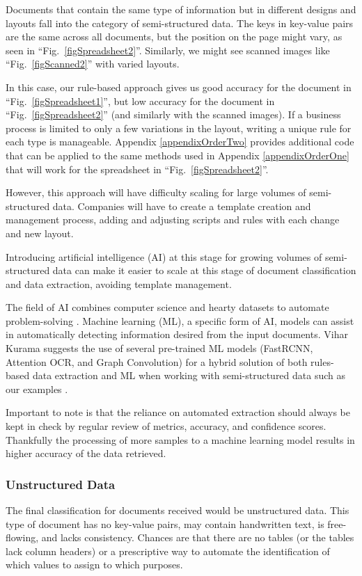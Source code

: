 \documentclass[conference, draftcls]{IEEEtran}
\begin{document}
Documents that contain the same type of information but in different designs and layouts fall into the category of semi-structured data. The keys in key-value pairs are the same across all documents, but the position on the page might vary, as seen in ``Fig.~\ref{figSpreadsheet2}''. Similarly, we might see scanned images like ``Fig.~\ref{figScanned2}'' with varied layouts.

In this case, our rule-based approach gives us good accuracy for the document in ``Fig.~\ref{figSpreadsheet1}'', but low accuracy for the document in ``Fig.~\ref{figSpreadsheet2}'' (and similarly with the scanned images). If a business process is limited to only a few variations in the layout, writing a unique rule for each type is manageable. Appendix \ref{appendixOrderTwo} provides additional code that can be applied to the same methods used in Appendix \ref{appendixOrderOne} that will work for the spreadsheet in ``Fig.~\ref{figSpreadsheet2}''.

However, this approach will have difficulty scaling for large volumes of semi-structured data. Companies will have to create a template creation and management process, adding and adjusting scripts and rules with each change and new layout.

Introducing artificial intelligence (AI) at this stage for growing volumes of semi-structured data can make it easier to scale at this stage of document classification and data extraction, avoiding template management. 

The field of AI combines computer science and hearty datasets to automate problem-solving \cite{ibm:ai}. Machine learning (ML), a specific form of AI, models can assist in automatically detecting information desired from the input documents. Vihar Kurama suggests the use of several pre-trained ML models (FastRCNN, Attention OCR, and Graph Convolution) for a hybrid solution of both rules-based data extraction and ML when working with semi-structured data such as our examples \cite{kurama2021a}.

Important to note is that the reliance on automated extraction should always be kept in check by regular review of metrics, accuracy, and confidence scores. Thankfully the processing of more samples to a machine learning model results in higher accuracy of the data retrieved.

\subsubsection{Unstructured Data}
The final classification for documents received would be unstructured data. This type of document has no key-value pairs, may contain handwritten text, is free-flowing, and lacks consistency. Chances are that there are no tables (or the tables lack column headers) or a prescriptive way to automate the identification of which values to assign to which purposes.
\end{document}
